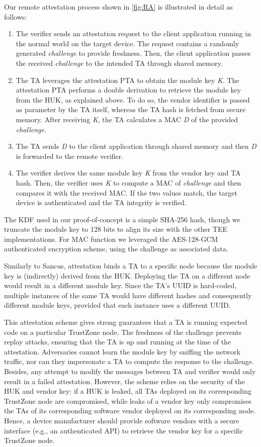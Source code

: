 Our remote attestation process shown in \cref{fig:RA} is illustrated in detail
as follows:
%
\begin{enumerate}
	\item The verifier sends an attestation request to the client application
	running in the normal world on the target device. The request contains a
	randomly generated \emph{challenge} to provide freshness. Then, the client
	application passes the received \emph{challenge} to the intended TA through
	shared memory.
	\item The TA leverages the attestation \ac{PTA} to obtain the module key
	\emph{K}. The attestation \ac{PTA} performs a double derivation to retrieve
	the module key from the \ac{HUK}, as explained above. To do so, the vendor
	identifier is passed as parameter by the TA itself, whereas the TA hash is
	fetched from secure memory. After receiving \emph{K}, the TA calculates a
	\ac{MAC} \emph{D} of the provided \emph{challenge}.
	\item The TA sends \emph{D} to the client application through shared memory
	and then \emph{D} is forwarded to the remote verifier. 
	\item The verifier derives the same module key \emph{K} from the vendor key
	and TA hash. Then, the verifier uses \emph{K} to compute a \ac{MAC} of
	\emph{challenge} and then compares it with the received \ac{MAC}. If the two
	values match, the target device is authenticated and the TA integrity is
	verified.
\end{enumerate}

The \ac{KDF} used in our proof-of-concept is a simple SHA-256 hash, though we
truncate the module key to 128 bits to align its size with the other \ac{TEE}
implementations. For \ac{MAC} function we leveraged the AES-128-GCM
authenticated encryption scheme, using the challenge as associated data.

Similarly to Sancus, attestation binds a TA to a specific node because the
module key is (indirectly) derived from the \ac{HUK}.
Deploying the TA on
a different node would result in a different module key. Since the TA's
UUID is hard-coded, multiple instances of the same TA would have different
hashes and consequently different module keys, provided that each instance uses
a different UUID.

This attestation scheme gives strong guarantees that a TA is running expected
code on a particular TrustZone node. The freshness of the challenge prevents
replay attacks, ensuring that the TA is up and running at the time of the
attestation. Adversaries cannot learn the module key by sniffing the network
traffic, nor can they impersonate a TA to compute the response to the challenge.
Besides, any attempt to modify the messages between TA and verifier would only
result in a failed attestation. However, the scheme relies on the security of
the \ac{HUK} and vendor key: if a \ac{HUK} is leaked, all TAs deployed on its
corresponding TrustZone node are compromised, while leaks of a vendor key
only compromises the TAs of its corresponding software vendor deployed on
its corresponding node. Hence, a device manufacturer should provide
software vendors with a secure interface (e.g., an authenticated API) to
retrieve the vendor key for a specific TrustZone node.

